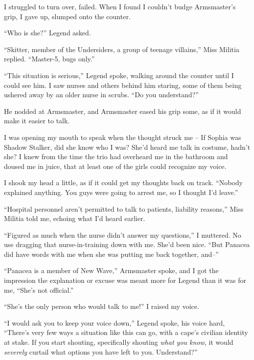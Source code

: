 I struggled to turn over, failed.  When I found I couldn't budge Armsmaster's grip, I gave up, slumped onto the counter.



``Who is she?'' Legend asked.



``Skitter, member of the Undersiders, a group of teenage villains,'' Miss Militia replied.  ``Master-5, bugs only.''



``This situation is serious,'' Legend spoke, walking around the counter until I could see him.  I saw nurses and others behind him staring, some of them being ushered away by an older nurse in scrubs.  ``Do you understand?''



He nodded at Armsmaster, and Armsmaster eased his grip some, as if it would make it easier to talk.



I was opening my mouth to speak when the thought struck me – If Sophia was Shadow Stalker, did she know who I was?  She'd heard me talk in costume, hadn't she?  I knew from the time the trio had overheard me in the bathroom and doused me in juice, that at least one of the girls could recognize my voice.



I shook my head a little, as if it could get my thoughts back on track.  ``Nobody explained anything.  You guys were going to arrest me, so I thought I'd leave.''



``Hospital personnel aren't permitted to talk to patients, liability reasons,'' Miss Militia told me, echoing what I'd heard earlier.



``Figured as much when the nurse didn't answer my questions,'' I muttered.  No use dragging that nurse-in-training down with me.  She'd been nice.  ``But Panacea did have words with me when she was putting me back together, and--''



``Panacea is a member of New Wave,'' Armsmaster spoke, and I got the impression the explanation or excuse was meant more for Legend than it was for me, ``She's not official.''



``She's the only person who would talk to me!'' I raised my voice.



``I would ask you to keep your voice down,'' Legend spoke, his voice hard, ``There's very few ways a situation like this can go, with a cape's civilian identity at stake.  If you start shouting, specifically shouting \emph{what you know}, it would \emph{severely} curtail what options you have left to you.  Understand?''



